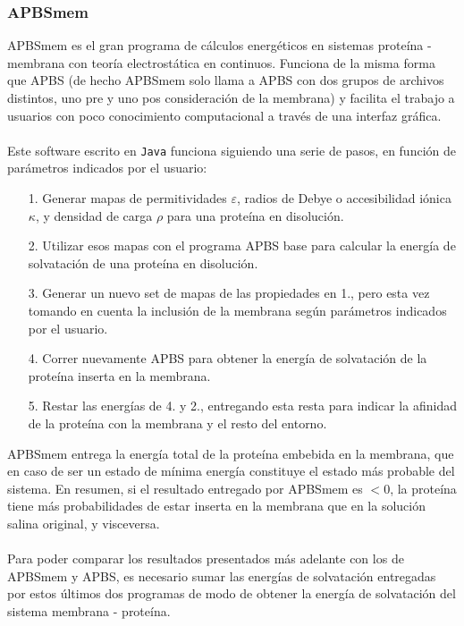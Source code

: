\documentclass[12pt, notitlepage]{article}
\numberwithin{equation}{section}
\begin{document}
\subsubsection{APBSmem}
APBSmem es el gran programa de cálculos energéticos en sistemas proteína - membrana con teoría electrostática en continuos. Funciona de la misma forma que APBS (de hecho APBSmem solo llama a APBS con dos grupos de archivos distintos, uno pre y uno pos consideración de la membrana) y facilita el trabajo a usuarios con poco conocimiento computacional a través de una interfaz gráfica.\\\\
Este software escrito en \texttt{Java} funciona siguiendo una serie de pasos, en función de parámetros indicados por el usuario:
\begin{itemize}
	\item[1.] Generar mapas de permitividades $\varepsilon$, radios de Debye o accesibilidad iónica $\kappa$, y densidad de carga $\rho$ para una proteína en disolución.
	\item[2.] Utilizar esos mapas con el programa APBS base para calcular la energía de solvatación de una proteína en disolución.
	\item[3.] Generar un nuevo set de mapas de las propiedades en 1., pero esta vez tomando en cuenta la inclusión de la membrana según parámetros indicados por el usuario.
	\item[4.] Correr nuevamente APBS para obtener la energía de solvatación de la proteína inserta en la membrana.
	\item[5.] Restar las energías de 4. y 2., entregando esta resta para indicar la afinidad de la proteína con la membrana y el resto del entorno.
\end{itemize}
APBSmem entrega la energía total de la proteína embebida en la membrana, que en caso de ser un estado de mínima energía constituye el estado más probable del sistema. En resumen, si el resultado entregado por APBSmem es $<0$, la proteína tiene más probabilidades de estar inserta en la membrana que en la solución salina original, y visceversa.\\\\
Para poder comparar los resultados presentados más adelante con los de APBSmem y APBS, es necesario sumar las energías de solvatación entregadas por estos últimos dos programas de modo de obtener la energía de solvatación del sistema membrana - proteína.
\end{document}
